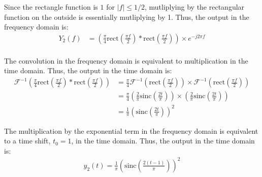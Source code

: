 \documentclass{article}
\begin{document}
\begin{enumerate}[label=2.\arabic*]
    Since the rectangle function is $1$ for $|f| \leq 1/2$, mutliplying by the rectangular function on the outside is essentially mutliplying by 1. Thus, the output in the frequency domain is:
    \begin{align*}
        Y_2(f) &=  \left(\frac{\pi}{4}\text{rect}\left(\frac{\pi f}{2}\right) \ast \text{rect}\left(\frac{\pi f}{2}\right)\right) \times e^{-j2\pi f} \\
    \end{align*}

    The convolution in the frequency domain is equivalent to multiplication in the time domain. Thus, the output in the time domain is:
    \begin{align*}
        \mathcal{F}^{-1}\left(\frac{\pi}{4}\text{rect}\left(\frac{\pi f}{2}\right) \ast \text{rect}\left(\frac{\pi f}{2}\right)\right) &= \frac{\pi}{4} \mathcal{F}^{-1}\left(\text{rect}\left(\frac{\pi f}{2}\right)\right) \times \mathcal{F}^{-1}\left(\text{rect}\left(\frac{\pi f}{2}\right)\right) \\
        &= \frac{\pi}{4} \left(\frac{2}{\pi} \text{sinc}\left(\frac{2t}{\pi}\right)\right) \times \left(\frac{2}{\pi} \text{sinc}\left(\frac{2t}{\pi}\right)\right) \\
        &= \frac{1}{\pi}\left(\text{sinc}\left(\frac{2t}{\pi}\right)\right)^2 \
    \end{align*}

    The multiplication by the exponential term in the frequency domain is equivalent to a time shift, $t_0 = 1$,  in the time domain. Thus, the output in the time domain is:
    \begin{align*}
        y_2(t) = \boxed{\frac{1}{\pi}\left(\text{sinc}\left(\frac{2(t-1)}{\pi}\right)\right)^2}
    \end{align*}

\end{enumerate}
\end{document}
